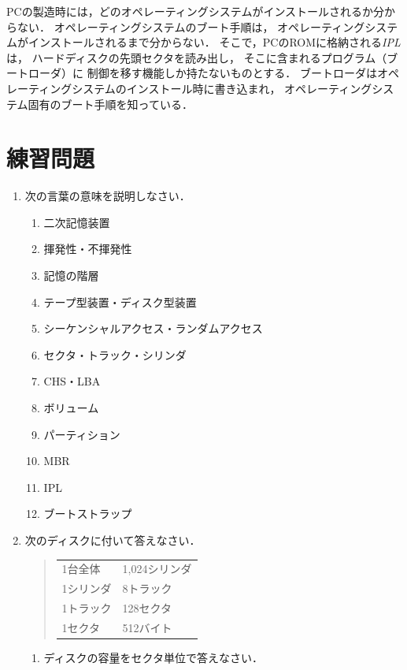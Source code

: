 PCの製造時には，どのオペレーティングシステムがインストールされるか分からない．
オペレーティングシステムのブート手順は，
オペレーティングシステムがインストールされるまで分からない．
そこで，PCのROMに格納される\emph{IPL}は，
ハードディスクの先頭セクタを読み出し，
そこに含まれるプログラム（ブートローダ）に
制御を移す機能しか持たないものとする．
ブートローダはオペレーティングシステムのインストール時に書き込まれ，
オペレーティングシステム固有のブート手順を知っている．

\newpage
\section*{練習問題}
\begin{enumerate}
  \renewcommand{\labelenumi}{\ttfamily\arabic{chapter}.\arabic{enumi}}
  \setlength{\leftskip}{1em}
\item 次の言葉の意味を説明しなさい．
  \begin{enumerate}
  \item 二次記憶装置
  \item 揮発性・不揮発性
  \item 記憶の階層
  \item テープ型装置・ディスク型装置
  \item シーケンシャルアクセス・ランダムアクセス
  \item セクタ・トラック・シリンダ
  \item CHS・LBA
  \item ボリューム
  \item パーティション
  \item MBR
  \item IPL
  \item ブートストラップ
  \end{enumerate}
\item 次のディスクに付いて答えなさい．
  \begin{quote}
    \begin{tabular}{l l}
      1台全体   & 1,024シリンダ  \\
      1シリンダ & 8トラック      \\
      1トラック & 128セクタ      \\
      1セクタ   & 512バイト
    \end{tabular}
  \end{quote}
  \begin{enumerate}
  \item ディスクの容量をセクタ単位で答えなさい．

\end{enumerate}
\end{enumerate}
